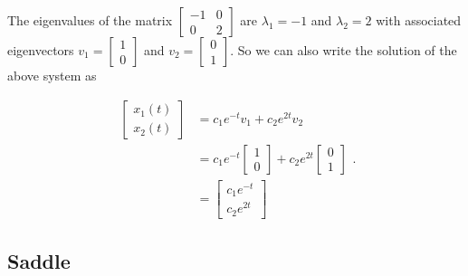 \documentclass[12pt]{article}
\theoremstyle{definition}
\begin{document}
The eigenvalues of the matrix $\begin{bmatrix} -1 & 0 \\ 0 & 2 \end{bmatrix}$ are $\lambda_1 = -1$ and $\lambda_2 = 2$ with associated eigenvectors $v_1 = \begin{bmatrix} 1 \\ 0 \end{bmatrix}$ and $v_2 = \begin{bmatrix} 0 \\ 1 \end{bmatrix}$. So we can also write the solution of the above system as

\begin{equation*}
\begin{split}
\begin{bmatrix}
x_1(t) \\
x_2(t)
\end{bmatrix}
&=
c_1 e^{-t} v_1 + c_2 e^{2t} v_2 \\
&=
c_1 e^{-t}
\begin{bmatrix}
1 \\
0
\end{bmatrix}
+
c_2 e^{2t}
\begin{bmatrix}
0 \\
1
\end{bmatrix} \\
&=
\begin{bmatrix}
c_1 e^{-t} \\
c_2 e^{2t}
\end{bmatrix}
\end{split}
.
\end{equation*}


\subsection{Saddle}


\end{document}

